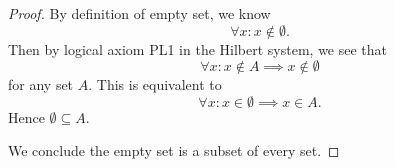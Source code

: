 \begin{Exercise}
\begin{proof}
By definition of empty set, we know
$$
\forall x: x\notin \emptyset.
$$
Then by logical axiom PL1 in the Hilbert system, we see that
$$
\forall x: x\notin A \implies x\notin \emptyset
$$
for any set $A$. This is equivalent to
$$
\forall x: x\in \emptyset \implies x\in A.
$$
Hence $\emptyset \subseteq A$.

We conclude the empty set is a subset of every set.
\end{proof}
\end{Exercise}